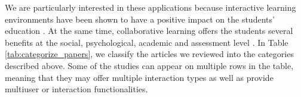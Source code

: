 We are particularly interested in these applications because interactive learning environments have been shown to have a positive impact on the students' education \citep{johnson2000animated}. At the same time, collaborative learning offers the students several benefits at the social, psychological, academic and assessment level \citep{laal2012benefits}. In Table \ref{tab:categorize_papers}, we classify the \papersSelected articles we reviewed into the categories described above. Some of the studies can appear on multiple rows in the table, meaning that they may offer multiple interaction types as well as provide multiuser or interaction functionalities.

